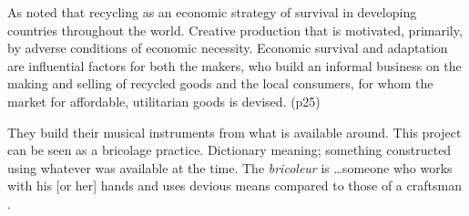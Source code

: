 


As noted that recycling as an economic strategy of survival in developing countries throughout the world. Creative production that is motivated, primarily, by adverse conditions of economic necessity. Economic survival and adaptation are influential factors for both the makers, who build an informal business on the making and selling of recycled goods and the local consumers, for whom the market for affordable, utilitarian goods is devised. (p25)

They build their musical instruments from what is available around. This project can be seen as a bricolage practice. Dictionary meaning; something constructed using whatever was available at the time.  The \textit{bricoleur} is \ldots someone who works with his [or her] hands and uses devious means compared to those of a craftsman \citep{levi1966savage}.


